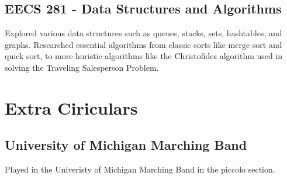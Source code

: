 \documentclass{article}
\begin{document}
\subsection{EECS 281 - Data Structures and Algorithms}
Explored various data structures such as queues, stacks, sets, hashtables, and graphs.
Researched essential algorithms from classic sorts like merge sort and quick sort, to more huristic algorithms like the
Christofides algorithm used in solving the Traveling Salesperson Problem.

\section{Extra Ciriculars}
\subsection{University of Michigan Marching Band}
Played in the Univeristy of Michigan Marching Band in the piccolo section.
\end{document}
